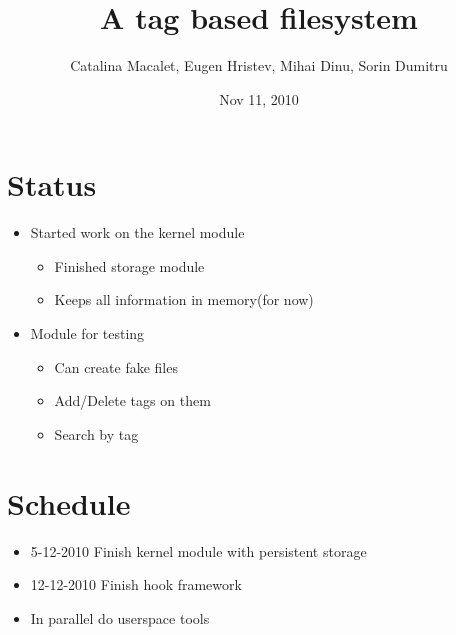 \documentclass{beamer}
\title[TagFS]{A tag based filesystem}
\author{Catalina Macalet, Eugen Hristev, Mihai Dinu, Sorin Dumitru}
\institute{Politehnic University of Bucharest}
\date{Nov 11, 2010}
\begin{document}
\begin{frame}
  \titlepage
\end{frame}

\section{Status}

\begin{frame}
\begin{itemize}
	\item Started work on the kernel module
	\begin{itemize}
		\item Finished storage module
		\item Keeps all information in memory(for now)
	\end{itemize}
\end{itemize}
\end{frame}

\begin{frame}
\begin{itemize}
	\item Module for testing
	\begin{itemize}
		\item Can create fake files
		\item Add/Delete tags on them
		\item Search by tag
	\end{itemize}
\end{itemize}
\end{frame}

\section{Schedule}

\begin{frame}
  \begin{itemize}
    \item 5-12-2010 Finish kernel module with persistent storage
    \item 12-12-2010 Finish hook framework
    \item In parallel do userspace tools
  \end{itemize}
\end{frame}
\end{document}
